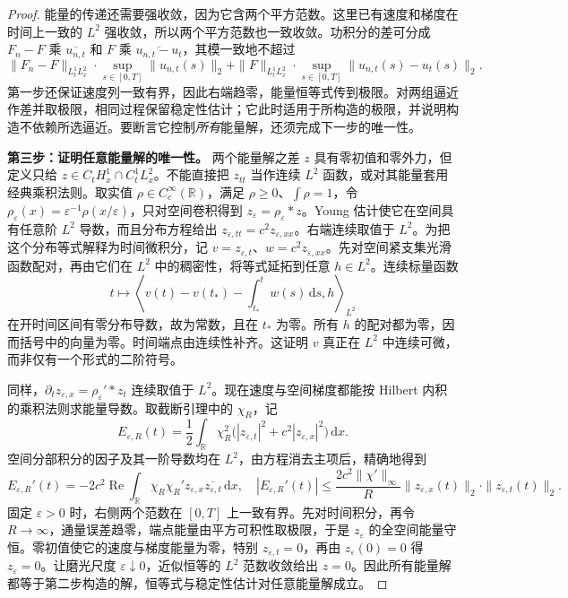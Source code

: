 \begin{proof}
能量的传递还需要强收敛，因为它含两个平方范数。这里已有速度和梯度在时间上一致的 \(L^2\) 强收敛，所以两个平方范数也一致收敛。功积分的差可分成 \(F_n-F\) 乘 \(\overline{u_{n,t}}\) 和 \(F\) 乘 \(\overline{u_{n,t}-u_t}\)，其模一致地不超过
\[
 \|F_n-F\|_{L^1_tL^2_x}\cdot\sup_{s\in[0,T]}\|u_{n,t}(s)\|_2
 +\|F\|_{L^1_tL^2_x}\cdot\sup_{s\in[0,T]}\|u_{n,t}(s)-u_t(s)\|_2.
\]
第一步还保证速度列一致有界，因此右端趋零，能量恒等式传到极限。对两组逼近作差并取极限，相同过程保留稳定性估计；它此时适用于所构造的极限，并说明构造不依赖所选逼近。要断言它控制\emph{所有}能量解，还须完成下一步的唯一性。

\textbf{第三步：证明任意能量解的唯一性。}
两个能量解之差 \(z\) 具有零初值和零外力，但定义只给 \(z\in C_tH^1_x\cap C_t^1L^2_x\)。不能直接把 \(z_{tt}\) 当作连续 \(L^2\) 函数，或对其能量套用经典乘积法则。取实值 \(\rho\in C_c^\infty(\mathbb R)\)，满足 \(\rho\geq0\)、\(\int\rho=1\)，令 \(\rho_\varepsilon(x)=\varepsilon^{-1}\rho(x/\varepsilon)\)，只对空间卷积得到 \(z_\varepsilon=\rho_\varepsilon*z\)。Young 估计使它在空间具有任意阶 \(L^2\) 导数，而且分布方程给出 \(z_{\varepsilon,tt}=c^2z_{\varepsilon,xx}\)。右端连续取值于 \(L^2\)。为把这个分布等式解释为时间微积分，记 \(v=z_{\varepsilon,t}\)、\(w=c^2z_{\varepsilon,xx}\)。先对空间紧支集光滑函数配对，再由它们在 \(L^2\) 中的稠密性，将等式延拓到任意 \(h\in L^2\)。连续标量函数
\[
 t\longmapsto\left\langle v(t)-v(t_*)-\int_{t_*}^tw(s)\,\mathrm{d}s,h\right\rangle_{L^2}
\]
在开时间区间有零分布导数，故为常数，且在 \(t_*\) 为零。所有 \(h\) 的配对都为零，因而括号中的向量为零。时间端点由连续性补齐。这证明 \(v\) 真正在 \(L^2\) 中连续可微，而非仅有一个形式的二阶符号。

同样，\(\partial_tz_{\varepsilon,x}=\rho_\varepsilon'*z_t\) 连续取值于 \(L^2\)。现在速度与空间梯度都能按 Hilbert 内积的乘积法则求能量导数。取截断引理中的 \(\chi_R\)，记
\[
 E_{\varepsilon,R}(t)=\frac12\int_{\mathbb R}\chi_R^2
 \bigl(|z_{\varepsilon,t}|^2+c^2|z_{\varepsilon,x}|^2\bigr)\,\mathrm{d}x.
\]
空间分部积分的因子及其一阶导数均在 \(L^2\)，由方程消去主项后，精确地得到
\[
 E_{\varepsilon,R}'(t)=-2c^2\operatorname{Re}\int_{\mathbb R}
 \chi_R\chi_R' z_{\varepsilon,x}\overline{z_{\varepsilon,t}}\,\mathrm{d}x,
\quad
 |E_{\varepsilon,R}'(t)|\leq\frac{2c^2\|\chi'\|_\infty}{R}
 \|z_{\varepsilon,x}(t)\|_2\cdot\|z_{\varepsilon,t}(t)\|_2.
\]
固定 \(\varepsilon>0\) 时，右侧两个范数在 \([0,T]\) 上一致有界。先对时间积分，再令 \(R\to\infty\)，通量误差趋零，端点能量由平方可积性取极限，于是 \(z_\varepsilon\) 的全空间能量守恒。零初值使它的速度与梯度能量为零，特别 \(z_{\varepsilon,t}=0\)，再由 \(z_\varepsilon(0)=0\) 得 \(z_\varepsilon=0\)。让磨光尺度 \(\varepsilon\downarrow0\)，近似恒等的 \(L^2\) 范数收敛给出 \(z=0\)。因此所有能量解都等于第二步构造的解，恒等式与稳定性估计对任意能量解成立。
\end{proof}

